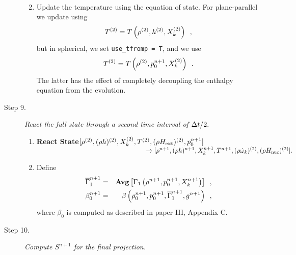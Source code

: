 \begin{description}
\begin{enumerate}
\begin{eqnarray}
\end{eqnarray}
\item Update the temperature using the equation of state.  For plane-parallel we
update using
\begin{equation}
T^{(2)} = T\left(\rho^{(2)}, h^{(2)}, X_k^{(2)}\right) \enskip ,
\end{equation}
but in spherical, we set {\tt use\_tfromp = T}, and we use
\begin{equation}
T^{(2)} = T\left(\rho^{(2)}, p_0^{n+1}, X_k^{(2)}\right) \enskip .
\end{equation}
The latter has the effect of completely decoupling the enthalpy equation from the 
evolution.

\end{enumerate}

\item[Step 9.] {\em React the full state through a second time interval of $\Delta t / 2.$}

\begin{enumerate}
\renewcommand{\theenumi}{{\bf \alph{enumi}}}

\item {\bf React State}$[\rho^{(2)},(\rho h)^{(2)}, X_k^{(2)},T^{(2)}, (\rho{H_{\rm ext}})^{(2)},
p_0^{n+1}]$\\
$~~~~~~~~~~~~~~~~~~~~~~~~~~~~~~~~~~~~~~~~~~~~~~~~~~\rightarrow [\rho^{n+1}, 
(\rho h)^{n+1}, X_k^{n+1}, T^{n+1}, (\rho \dot{\omega}_k)^{(2)}, (\rho {H_{\rm nuc}})^{(2)} ].$  

\item Define
\begin{eqnarray}
 \overline{\Gamma}_1^{n+1}    &=& {\rm{\bf Avg}}\left[\Gamma_1\left(\rho^{n+1}, p_0^{n+1}, X_k^{n+1}\right) \right] \enskip , \\ 
 \beta_0^{n+1}    &=& \beta   \left(\rho_0^{n+1}, p_0^{n+1}, \overline{\Gamma}_1^{n+1}, g^{n+1}\right) \enskip ,
\end{eqnarray}
where $\beta_0$ is computed as described in paper III, Appendix C.

\end{enumerate}

\item[Step 10.] {\em Compute $S^{n+1}$ for the final projection.}


\end{description}
